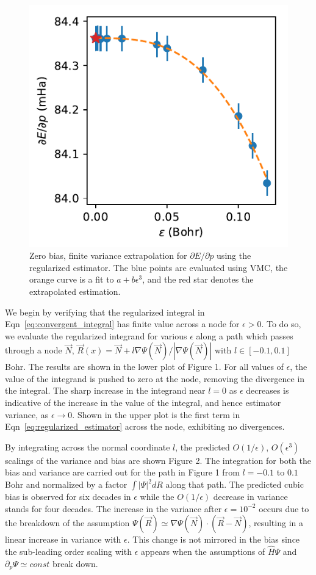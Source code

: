 \documentclass[twocolumn]{revtex4-1}
\begin{document}
\begin{figure}
\includegraphics{../2_plots/dedp.pdf}
\caption{Zero bias, finite variance extrapolation for $\partial E/\partial p$ using the regularized estimator. The blue points are evaluated using VMC, the orange curve is a fit to $a + b\epsilon^3$, and the red star denotes the extrapolated estimation. }
\end{figure}

We begin by verifying that the regularized integral in Eqn~\ref{eq:convergent_integral} has finite value across a node for $\epsilon > 0$. 
To do so, we evaluate the regularized integrand for various $\epsilon$ along a path which passes through a node $\vec{N}$, $\vec{R}(x) = \vec{N} + l \nabla \Psi(\vec{N})/|\nabla \Psi(\vec{N})|$ with $l \in [-0.1, 0.1]$ Bohr.
The results are shown in the lower plot of Figure 1.
For all values of $\epsilon$, the value of the integrand is pushed to zero at the node, removing the divergence in the integral.
The sharp increase in the integrand near $l=0$ as $\epsilon$ decreases is indicative of the increase in the value of the integral, and hence estimator variance, as $\epsilon \rightarrow 0$.
Shown in the upper plot is the first term in Eqn~\ref{eq:regularized_estimator} across the node, exhibiting no divergences.

By integrating across the normal coordinate $l$, the predicted $O(1/\epsilon)$, $O(\epsilon^3)$ scalings of the variance and bias are shown Figure 2.
The integration for both the bias and variance are carried out for the path in Figure 1 from $l = -0.1$ to $0.1$ Bohr and normalized by a factor $\int |\Psi|^2 dR$ along that path.
The predicted cubic bias is observed for six decades in $\epsilon$ while the $O(1/\epsilon)$ decrease in variance stands for four decades.
The increase in the variance after $\epsilon = 10^{-2}$ occurs due to the breakdown of the assumption $\Psi(\vec{R}) \simeq \nabla\Psi(\vec{N}) \cdot (\vec{R}-\vec{N})$, resulting in a linear increase in variance with $\epsilon$.
This change is not mirrored in the bias since the sub-leading order scaling with $\epsilon$ appears when the assumptions of $\hat{H}\Psi$ and $\partial_p \Psi \simeq const$ break down.
\end{document}
